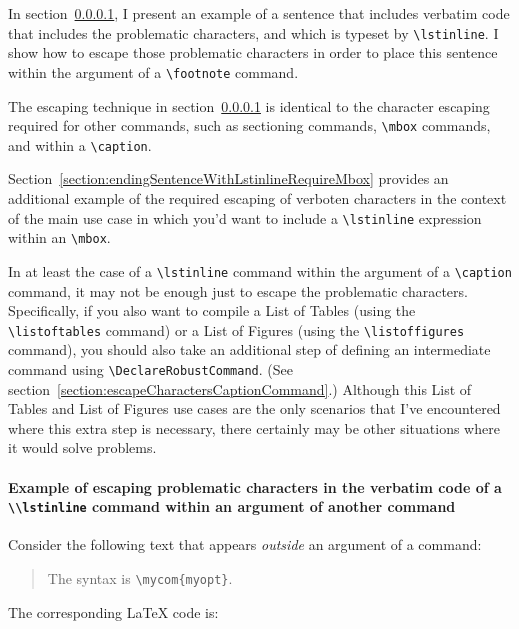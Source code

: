 \documentclass[12pt,table,final]{article}%
\begin{document}
In section~\ref{section:exampleEscapingCharactersWithinArgumentOfCommand}, I present an example of a sentence that includes verbatim code that includes the problematic characters, and which is typeset by \lstinline|\lstinline|. I show how to escape those problematic characters in order to place this sentence within the argument of a \lstinline|\footnote| command.

The escaping technique in section~\ref{section:exampleEscapingCharactersWithinArgumentOfCommand} is identical to the character escaping required for other commands, such as sectioning commands, \lstinline|\mbox| commands, and within a \lstinline|\caption|.

Section~\ref{section:endingSentenceWithLstinlineRequireMbox} provides an additional example of the required escaping of verboten characters in the context of the main use case in which you'd want to include a \lstinline|\lstinline| expression within an \lstinline|\mbox|.

In at least the case of a \lstinline|\lstinline| command within the argument of a \lstinline|\caption| command, it may not be enough just to escape the problematic characters. Specifically, if you also want to compile a List of Tables (using the \lstinline|\listoftables| command) or a List of Figures (using the \lstinline|\listoffigures| command), you should also take an additional step of defining an intermediate command using \lstinline|\DeclareRobustCommand|. (See section~\ref{section:escapeCharactersCaptionCommand}.) Although this List of Tables and List of Figures use cases are the only scenarios that I've encountered where this extra step is necessary, there certainly may be other situations where it would solve problems.

\paragraph{Example of escaping problematic characters in the verbatim code of a \lstinline|\\lstinline| command within an argument of another command}
\label{section:exampleEscapingCharactersWithinArgumentOfCommand}
Consider the following text that appears \emph{outside} an argument of a command:
\begin{quote}
The syntax is \lstinline|\mycom{myopt}|.
\end{quote}
The corresponding \LaTeX{} code is:
\end{document}
